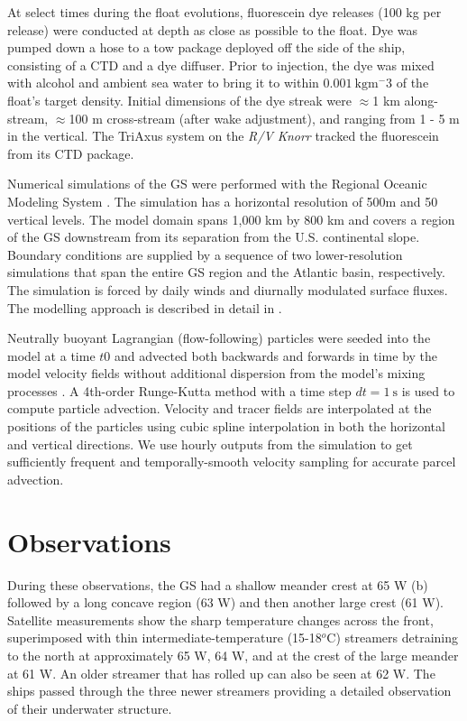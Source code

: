 \documentclass[draft,grl]{agutex2015}
\providecommand{\DIFadd}[1]{{\protect\color{blue}\uwave{#1}}} %
\providecommand{\DIFdel}[1]{{\protect\color{red}\sout{#1}}}                      %
\providecommand{\DIFaddbegin}{} %
\providecommand{\DIFaddend}{} %
\providecommand{\DIFdelbegin}{} %
\providecommand{\DIFdelend}{} %
\begin{document}
\begin{article}
At select times during the float evolutions, fluorescein dye releases (100 kg per release) were conducted at depth as close as possible to the float.  Dye was pumped down a hose to a tow package deployed off the side of the ship, consisting of a CTD and a dye diffuser.  Prior to injection, the dye was mixed with alcohol and ambient sea water to bring it to within \DIFdelbegin \DIFdel{$0.001\ \mathrm{kg m^-3}$ }\DIFdelend \DIFaddbegin \DIFadd{$0.001\ \mathrm{kg m^{-3}}$ }\DIFaddend of the float's target density. Initial dimensions of the dye streak were $\approx$1 km along-stream, $\approx$100 m cross-stream (after wake adjustment), and ranging from 1 - 5 m in the vertical. The TriAxus system on the \emph{R/V Knorr} tracked the fluorescein from its CTD package.  

Numerical simulations of the GS were performed with the Regional Oceanic Modeling System \citep[ROMS][]{shchepetkinmcwilliams05}. The simulation has a horizontal resolution of 500m and 50 vertical levels. The model domain spans 1,000 km by 800 km and covers a region of the GS downstream from its separation from the U.S. continental slope. Boundary conditions are supplied by a sequence of two lower-resolution simulations that span the entire GS region and the Atlantic basin, respectively. The simulation is forced by daily winds and diurnally modulated surface fluxes. The modelling approach is described in detail in \citet{gulaetal15}.

Neutrally buoyant Lagrangian (flow-following) particles were seeded into the model at a time $t0$ and advected both backwards and forwards in time by the model velocity fields without additional dispersion from the model's mixing processes \citep{gulaetal14}. A 4th-order Runge-Kutta method with a  time step  $dt = 1\ \mathrm{s}$ is used to compute particle advection. Velocity and tracer fields are interpolated at the positions of the particles using cubic spline interpolation in both the horizontal and vertical directions.  We use hourly outputs from the simulation to get sufficiently frequent and temporally-smooth velocity sampling for accurate parcel advection.


\section{Observations}

During these observations, the GS had a shallow meander crest at 65 W (b)  followed by a long concave region (63 W) and then another large  crest (61 W).  Satellite measurements show the sharp temperature changes across the front, superimposed with thin intermediate-temperature (15-18$^o$C) streamers detraining to the north at approximately 65 W, 64 W, and at the crest of the large meander at 61 W.  An older streamer that has rolled up can also be seen at 62 W.  The ships passed through the three newer streamers providing a detailed observation of their underwater structure.  


\end{article}
\end{document}
